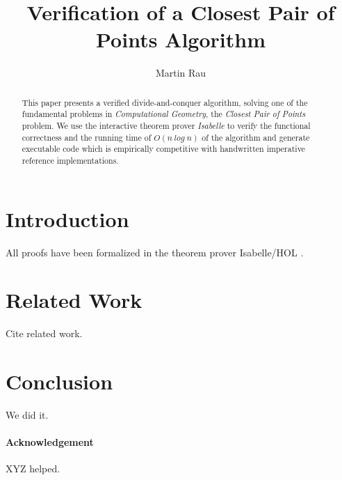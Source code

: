 \documentclass{llncs}
\begin{document}
\title{Verification of a Closest Pair of Points Algorithm}
\author{Martin Rau}
\date{}
\maketitle

\begin{abstract}
This paper presents a verified divide-and-conquer algorithm, solving one of the fundamental problems
in \textit{Computational Geometry}, the \textit{Closest Pair of Points} problem.
We use the interactive theorem prover \textit{Isabelle} to verify the functional correctness
and the running time of $\mathit{O(n\ log\;n)}$ of the algorithm and generate executable code which
is empirically competitive with handwritten imperative reference implementations.
\end{abstract}


\section{Introduction}

All proofs have been formalized in the theorem prover Isabelle/HOL \cite{LNCS2283,Concrete}.



\section{Related Work}

Cite related work.

\section{Conclusion}

We did it.

\paragraph{Acknowledgement}
XYZ helped.



\end{document}
